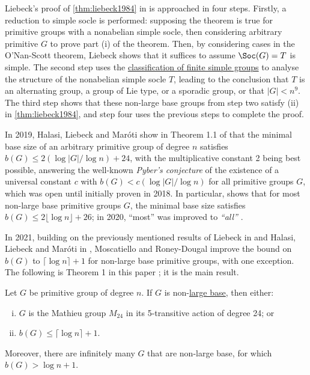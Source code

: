 Liebeck's proof of \autoref{thm:liebeck1984} in \cite{liebeck1984} is approached in four steps. Firstly, a reduction to simple socle is performed: supposing the theorem is true for primitive groups with a nonabelian simple socle, then considering arbitrary primitive $G$ to prove part (i) of the theorem. Then, by considering cases in the O'Nan-Scott theorem, Liebeck shows that it suffices to assume $\Soc(G) = T$ is simple. The second step uses the \hyperref[thm:cfsg]{classification of finite simple groups} to analyse the structure of the nonabelian simple socle $T$, leading to the conclusion that $T$ is an alternating group, a group of Lie type, or a sporadic group, or that $|G| < n^9$. The third step shows that these non-large base groups from step two satisfy (ii) in \autoref{thm:liebeck1984}, and step four uses the previous steps to complete the proof.

In 2019, Halasi, Liebeck and Mar\'oti show in Theorem 1.1 of \cite{halasi2019} that the minimal base size of an arbitrary primitive group of degree $n$ satisfies $b(G) \leq 2(\log|G|/\log n) + 24$, with the multiplicative constant 2 being best possible, answering the well-known \textit{Pyber's conjecture} of the existence of a universal constant $c$ with $b(G) < c(\log|G|/\log n)$ for all primitive groups $G$, which was open until initially proven in 2018. In particular, \cite{halasi2019} shows that for most non-large base primitive groups $G$, the minimal base size satisfies $b(G) \leq 2\lfloor\log n\rfloor + 26$; in 2020, ``most'' was improved to \textit{``all''} \cite{moscatiello_roney-dougal2021}.

In 2021, building on the previously mentioned results of Liebeck in \cite{liebeck1984} and Halasi, Liebeck and Mar\'oti in \cite{halasi2019}, Moscatiello and Roney-Dougal improve the bound on $b(G)$ to $\lceil\log n\rceil + 1$ for non-large base primitive groups, with one exception. The following is Theorem 1 in this paper \cite{moscatiello_roney-dougal2021}; it is the main result.

\begin{theorem}\label{thm:moscatiello_roney-dougal2021_1}
    Let $G$ be primitive group of degree $n$. If $G$ is non-\hyperref[def:large_base]{large base}, then either:
    \begin{enumerate}[(i)]
        \item $G$ is the Mathieu group $M_{24}$ in its 5-transitive action of degree 24; or
        \item $b(G) \leq \lceil\log n\rceil + 1$.
    \end{enumerate}
    Moreover, there are infinitely many $G$ that are non-large base, for which $b(G) > \log n + 1$.
\end{theorem}

